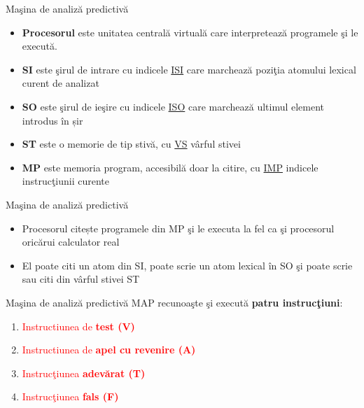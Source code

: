 \documentclass[pdf]{beamer}
\begin{document}
\begin{frame}{Maşina de analiză predictivă}
\begin{itemize}

\item \textbf{Procesorul} este unitatea centrală virtuală care interpretează programele şi le execută.

\item \textbf{SI} este şirul de intrare cu indicele  \underline{ISI} care marchează poziţia atomului lexical curent de analizat

\item \textbf{SO} este şirul de ieşire cu indicele  \underline{ISO} care marchează ultimul element introdus în șir

\item \textbf{ST} este o memorie de tip stivă, cu  \underline{VS} vârful stivei

\item \textbf{MP} este memoria program, accesibilă doar la citire, cu \underline{IMP} indicele instrucţiunii curente

\end{itemize}
\end{frame}



\begin{frame}{Maşina de analiză predictivă}
\begin{itemize}
\item Procesorul citește programele din MP şi le executa la fel ca şi procesorul oricărui calculator real
\item
El poate citi un atom din SI, poate scrie un atom lexical în SO şi poate scrie sau citi din vârful stivei ST

\end{itemize}
\end{frame}



\begin{frame}{Maşina de analiză predictivă}
MAP recunoaşte şi execută \textbf{patru instrucţiuni}:      

\begin{enumerate}

\item \textcolor{red}{Instructiunea de \textbf{test (V)}}

\item \textcolor{red}{Instructiunea de \textbf{apel cu revenire (A)}}

\item \textcolor{red}{Instrucţiunea \textbf{adevărat (T)}}

\item \textcolor{red}{Instrucţiunea \textbf{fals (F)}}

\end{enumerate}
\end{frame}
\end{document}
